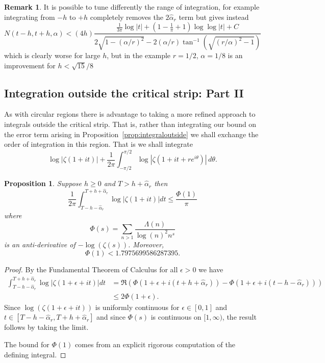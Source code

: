 \documentclass[10pt,english,letter, reqno]{amsart}
\theoremstyle{plain}
\newtheorem{proposition}[theorem]{Proposition}
\theoremstyle{definition}
\newtheorem{remark}[theorem]{Remark}
\begin{document}
\begin{remark}\label{rem:smallh}
It is possible to tune differently the range of integration, for example 
integrating from $-h$ to $+h$ completely removes the $2\hat{\alpha}_r$ term but gives instead
\[ N(t-h,t+h,\alpha) < (4h)\frac{\frac{1}{3\pi}\log|t| + (1-\frac{1}{\pi} + 1)\log\log|t| + C}{2\sqrt{1-(\alpha/r)^2}-2(\alpha/r)\tan^{-1}(\sqrt{(r/\alpha)^2-1})}  \]
which is clearly worse for large $h$, but in the example $r=1/2$, $\alpha=1/8$ is an improvement for $h<\sqrt{15}/{8}$
\end{remark}

\subsection{Integration outside the critical strip: Part II}\label{sec:intoutside2}

As with circular regions there is advantage to taking a more refined approach to integrals outside the critical strip. That is, rather than integrating our bound on the error term arising in Proposition~\ref{prop:integraloutside} we shall exchange the order of integration in this region. That is we shall integrate
\[  \log|\zeta(1+it)| + 
\frac{1}{2\pi}\int_{-\pi/2}^{\pi/2} \log|\zeta(1+it+re^{i\theta})|\,d\theta. \]

\begin{proposition}\label{prop:outside2}
 Suppose $h\geq0$ and $T>h+\hat{\alpha}_r$ then
\[   \frac{1}{2\pi}\int_{T-h-\hat{\alpha}_r}^{T+h+\hat{\alpha}_r}  \log|\zeta(1+it)|dt \leq \frac{\Phi(1)}{\pi}  \]
where
\begin{equation}\label{eq:phis} \Phi(s) = \sum_{n>1} \frac{\Lambda(n)}{\log(n)^2 n^s}
\end{equation}
is an anti-derivative of $-\log(\zeta(s))$.
Moreover,
\[ \Phi(1) < 1.7975699586287395. \]
\end{proposition}
\begin{proof}
By the Fundamental Theorem of Calculus for all $\epsilon > 0$ we have
\begin{align*} \int_{T-h-\hat{\alpha}_r}^{T+h+\hat{\alpha}_r}  \log|\zeta(1+\epsilon+it)|dt 
&= \Re(\Phi(1+\epsilon+i(t+h+\hat{\alpha}_r)) - \Phi(1+\epsilon+i(t-h-\hat{\alpha}_r)))
\\& \leq 2\Phi(1+\epsilon).
\end{align*}
Since $\log(\zeta(1+\epsilon+it))$ is uniformly continuous for $\epsilon\in[0,1]$ and $t\in [T-h-\hat{\alpha}_r,T+h+\hat{\alpha}_r]$ and since $\Phi(s)$ is continuous on $[1,\infty)$, the result follows by taking the limit.

The bound for $\Phi(1)$ comes from an explicit rigorous computation of the defining integral.
\end{proof}
\end{document}
